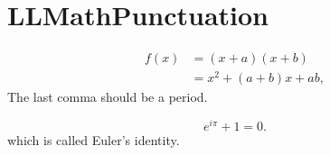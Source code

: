 \section{LLMathPunctuation}

\begin{align}
	f(x) & = (x+a)(x+b)         \\
	     & = x^2 + (a+b)x + ab,
\end{align}
The last comma should be a period.

\begin{equation*}
	e^{i \pi}+1=0.
\end{equation*}
which is called Euler's identity.

